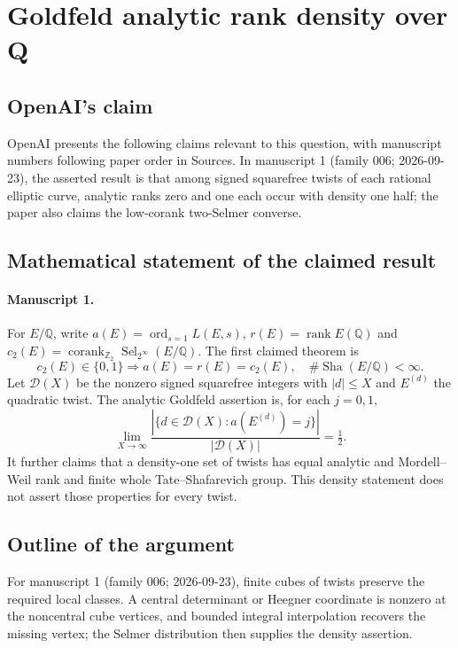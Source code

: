 \documentclass[11pt]{article}
\begin{document}
\section*{Goldfeld analytic rank density over Q}

\subsection{OpenAI's claim}
OpenAI presents the following claims relevant to this question, with manuscript numbers following paper order in Sources. In manuscript 1 (family 006; 2026-09-23), the asserted result is that among signed squarefree twists of each rational elliptic curve, analytic ranks zero and one each occur with density one half; the paper also claims the low-corank two-Selmer converse.

\subsection{Mathematical statement of the claimed result}
\paragraph{Manuscript 1.}
For $E/\mathbb Q$, write $a(E)=\operatorname{ord}_{s=1}L(E,s)$, $r(E)=\operatorname{rank}E(\mathbb Q)$ and $c_2(E)=\operatorname{corank}_{\mathbb Z_2}\operatorname{Sel}_{2^{\infty}}(E/\mathbb Q)$. The first claimed theorem is
\[
 c_2(E)\in\{0,1\}\Rightarrow a(E)=r(E)=c_2(E),\quad\#\operatorname{Sha}(E/\mathbb Q)<\infty.
\]
Let $\mathcal D(X)$ be the nonzero signed squarefree integers with $|d|\le X$ and $E^{(d)}$ the quadratic twist. The analytic Goldfeld assertion is, for each $j=0,1$,
\[
 \lim_{X\to\infty}\frac{|\{d\in\mathcal D(X):a(E^{(d)})=j\}|}{|\mathcal D(X)|}=\tfrac12.
\]
It further claims that a density-one set of twists has equal analytic and Mordell--Weil rank and finite whole Tate--Shafarevich group. This density statement does not assert those properties for every twist.

\subsection{Outline of the argument}
For manuscript 1 (family 006; 2026-09-23), finite cubes of twists preserve the required local classes. A central determinant or Heegner coordinate is nonzero at the noncentral cube vertices, and bounded integral interpolation recovers the missing vertex; the Selmer distribution then supplies the density assertion.
\end{document}

